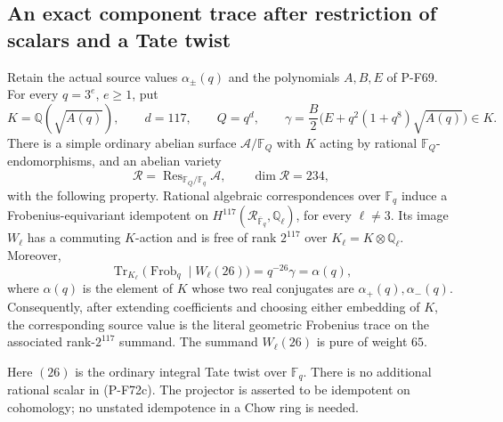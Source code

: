 \subsection{An exact component trace after restriction of scalars and a Tate twist}

\begin{proposition}
\label{prop:nonstandardtatetrace}
Retain the actual source values $\alpha_\pm(q)$ and the polynomials
$A,B,E$ of P-F69.  For every $q=3^e$, $e\ge1$, put
\[
 K=\mathbb Q(\sqrt{A(q)}),\qquad d=117,\qquad Q=q^d,
 \qquad
 \gamma=\frac B2\bigl(E+q^2(1+q^8)\sqrt{A(q)}\bigr)\in K.
                                                               \tag{P-F72a}
\]
There is a simple ordinary abelian surface
$\mathcal A/\mathbb F_Q$ with $K$ acting by rational
$\mathbb F_Q$-endomorphisms, and an abelian variety
\[
          \mathcal R=\operatorname{Res}_{\mathbb F_Q/\mathbb F_q}
                          \mathcal A,\qquad \dim\mathcal R=234,
                                                               \tag{P-F72b}
\]
with the following property.  Rational algebraic correspondences
over $\mathbb F_q$ induce a Frobenius-equivariant idempotent on
$H^{117}(\mathcal R_{\overline{\mathbb F}_q},\mathbb Q_\ell)$,
for every $\ell\ne3$.  Its image $W_\ell$ has a commuting
$K$-action and is free of rank $2^{117}$ over
$K_\ell=K\otimes\mathbb Q_\ell$.  Moreover,
\[
 \operatorname{Tr}_{K_\ell}
       \bigl(\operatorname{Frob}_q\mid W_\ell(26)\bigr)
       =q^{-26}\gamma=\alpha(q),                              \tag{P-F72c}
\]
where $\alpha(q)$ is the element of $K$ whose two real
conjugates are $\alpha_+(q),\alpha_-(q)$.
Consequently, after extending coefficients and choosing either
embedding of $K$, the corresponding source value is the literal
geometric Frobenius trace on the associated rank-$2^{117}$
summand.  The summand $W_\ell(26)$ is pure of weight $65$.

Here $(26)$ is the ordinary integral Tate twist over
$\mathbb F_q$.  There is no additional rational scalar in
(P-F72c).  The projector is asserted to be idempotent on
cohomology; no unstated idempotence in a Chow ring is needed.
\end{proposition}

